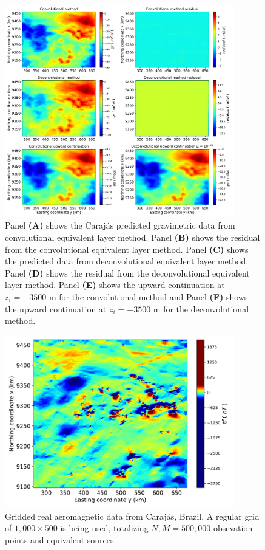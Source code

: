 \begin{figure}[htbp]
	\begin{center}
		\includegraphics[width=10cm]{Fig/carajas_gz_predito_1000x500}
	\end{center}
	\caption{Panel \textbf{(A)} shows the Carajás predicted gravimetric data from convolutional equivalent layer method. Panel \textbf{(B)} shows the residual from the convolutional equivalent layer method. Panel \textbf{(C)} shows the predicted data from deconvolutional equivalent layer method. Panel \textbf{(D)} shows the residual from the deconvolutional equivalent layer method. Panel \textbf{(E)} shows the upward continuation at $z_i = -3500$ m for the convolutional method and Panel \textbf{(F)} shows the upward continuation at $z_i = -3500$ m for the deconvolutional method.}
	\label{fig:10}
\end{figure}

\begin{figure}[htbp]
	\begin{center}
		\includegraphics[width=10cm]{Fig/carajas_tf_real_data_1000x500}
	\end{center}
	\caption{Gridded real aeromagnetic data from Carajás, Brazil. A regular grid of $1,000 \times 500$ is being used, totalizing $N,M = 500, 000$ obsevation points and equivalent sources.}
	\label{fig:11}
\end{figure}

